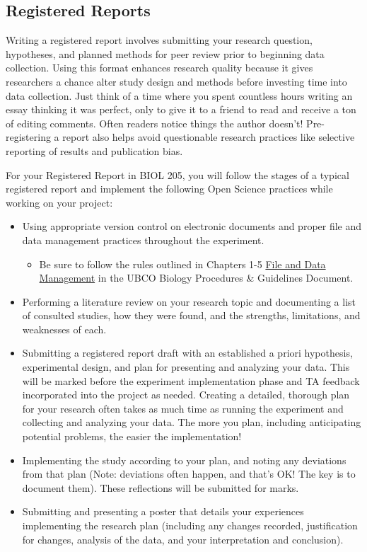 \documentclass[
]{book}
\providecommand{\tightlist}{%
  \setlength{\itemsep}{0pt}\setlength{\parskip}{0pt}}
\begin{document}
\hypertarget{registered-reports}{%
\subsection*{Registered Reports}\label{registered-reports}}

Writing a registered report involves submitting your research question, hypotheses, and planned methods for peer review prior to beginning data collection. Using this format enhances research quality because it gives researchers a chance alter study design and methods before investing time into data collection. Just think of a time where you spent countless hours writing an essay thinking it was perfect, only to give it to a friend to read and receive a ton of editing comments. Often readers notice things the author doesn't! Pre-registering a report also helps avoid questionable research practices like selective reporting of results and publication bias.

For your Registered Report in BIOL 205, you will follow the stages of a typical registered report and implement the following Open Science practices while working on your project:

\begin{itemize}
\tightlist
\item
  Using appropriate version control on electronic documents and proper file and data management practices throughout the experiment.

  \begin{itemize}
  \tightlist
  \item
    Be sure to follow the rules outlined in Chapters 1-5 \href{https://ubco-biology.github.io/Procedures-and-Guidelines/file-and-data-management.html}{File and Data Management} in the UBCO Biology Procedures \& Guidelines Document.
  \end{itemize}
\item
  Performing a literature review on your research topic and documenting a list of consulted studies, how they were found, and the strengths, limitations, and weaknesses of each.
\item
  Submitting a registered report draft with an established a priori hypothesis, experimental design, and plan for presenting and analyzing your data. This will be marked before the experiment implementation phase and TA feedback incorporated into the project as needed. Creating a detailed, thorough plan for your research often takes as much time as running the experiment and collecting and analyzing your data. The more you plan, including anticipating potential problems, the easier the implementation!
\item
  Implementing the study according to your plan, and noting any deviations from that plan (Note: deviations often happen, and that's OK! The key is to document them). These reflections will be submitted for marks.
\item
  Submitting and presenting a poster that details your experiences implementing the research plan (including any changes recorded, justification for changes, analysis of the data, and your interpretation and conclusion).
\end{itemize}
\end{document}
